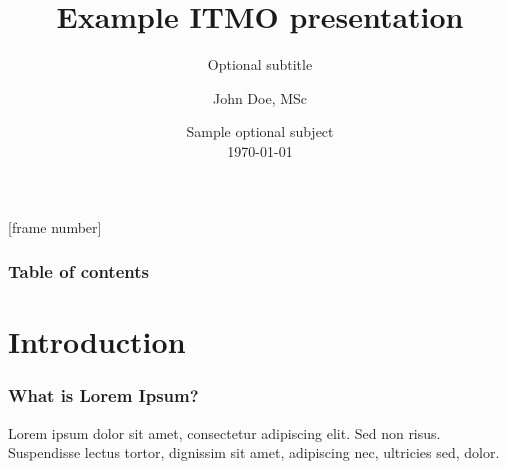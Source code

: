 \documentclass[
	11pt,
	aspectratio=169,
]{beamer}
\title[ITMO example]{Example ITMO presentation} %
\subtitle{Optional subtitle} %
\author[Doe]{John Doe, MSc} %
\institute[ITMO]{ITMO University, johndoe@mail.com} %
\date[\today]{
    Sample optional subject
    \\ \today} %
\begin{document}
\begin{frame}
	\titlepage %
\end{frame}
[frame number]



\begin{frame}
	\frametitle{Table of contents} %
	
	\tableofcontents %
\end{frame}


\section{Introduction}
\begin{frame}
	\frametitle{What is Lorem Ipsum?}
	Lorem ipsum dolor sit amet, consectetur adipiscing elit. Sed non risus. Suspendisse lectus tortor, dignissim sit amet, adipiscing nec, ultricies sed, dolor.
\end{frame}
\end{document}
